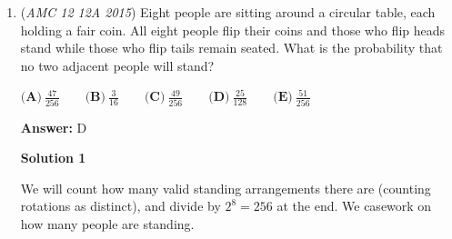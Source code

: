 \begin{enumerate}
\textbf{Solution 5 (Coord Bash)}

Set $B$ as $(0,0,0)$, $C$ at $(4,0,0)$, and $A$ at $(4,3,0)$. If we find $D$'s coordinates then the z-coordinate(the last coord) is the height we need since the rest of the coordinates have a z-coord of $0$. Notice that we are given every distance from point $D$, we can use basically satellite-type triangulation. $D$ is at every point a radius from points $A,B$ and $C$, or a sphere with the center at points $A,B$ and $C$. We can set up a system of equations to find where all 3 spheres intersect. 
 \[\begin{split} (x-4)^2+(y-3)^2+z^2 &=3^2 \\ x^2+y^2+z^2 &=4^2 \\ (x-4)^2+y^2+z^2 &=(\frac{12}{5}\sqrt2)^2 \end{split}\]Solving this system of equations gives you:
 \[\begin{split} x &=\frac{64}{25} \\ y &=\frac{48}{25} \\ z &=\frac{12}{5}  \end{split}\]Since $z$ is the value we need, we can now solve for the volume. The base is just $\frac{3*4}{2}=6$
 \[\begin{split} V &=\frac{1}{3}bh \\ V &=\frac{1}{3}(6)(\frac{12}{5}) \\ V &=\frac{72}{15} \\ V &=\boxed{\textbf{(C)}\dfrac{24}{5}} \end{split}\]



	\item (\textit{AMC 12 12A 2015}) Eight people are sitting around a circular table, each holding a fair coin. All eight people flip their coins and those who flip heads stand while those who flip tails remain seated. What is the probability that no two adjacent people will stand?


 $\textbf{(A)}\ \frac{47}{256} \qquad\textbf{(B)}\ \frac{3}{16} \qquad\textbf{(C)}\ \frac{49}{256} \qquad\textbf{(D)}\ \frac{25}{128} \qquad\textbf{(E)}\ \frac{51}{256}$

 \textbf{Answer: }D



\textbf{Solution 1}

We will count how many valid standing arrangements there are (counting rotations as distinct), and divide by $2^8 = 256$ at the end. We casework on how many people are standing.


\end{enumerate}
